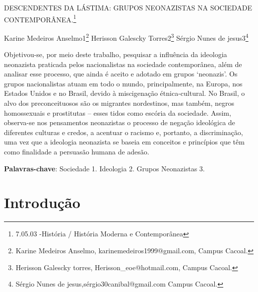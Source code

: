 \documentclass[article,12pt,onesidea,4paper,english,brazil]{abntex2}
\begin{document}
	
	
	\frenchspacing 
	
	\begin{center}
		\LARGE DESCENDENTES DA LÁSTIMA:
		GRUPOS NEONAZISTAS NA SOCIEDADE CONTEMPORÂNEA.\footnote{ 7.05.03 -História / História Moderna e Contemporânea}
		
		\normalsize
	Karine Medeiros Anselmo1\footnote{Karine Medeiros Anselmo, karinemedeiros1999@gmail.com, Campus Cacoal.} 
	Herisson Galescky Torres2\footnote{Herisson Galescky torres, Herisson\_eoe@hotmail.com, Campus Cacoal.} 
	Sérgio Nunes de jesus3\footnote{Sérgio Nunes de jesus,sérgio30canibal@gmail.com Campus Cacoal.} 
	\end{center}
	
	\begin{resumoumacoluna}
		Objetivou-se, por meio deste trabalho, pesquisar a influência da ideologia neonazista praticada pelos nacionalistas na sociedade contemporânea, além de analisar esse processo, que ainda é aceito e adotado em grupos ‘neonazis’. Os grupos nacionalistas atuam em todo o mundo, principalmente, na Europa, nos Estados Unidos e no Brasil, devido à miscigenação étnica-cultural. No Brasil, o alvo dos preconceituosos são os migrantes nordestinos, mas também, negros homossexuais e prostitutas – esses tidos como escória da sociedade. Assim, observa-se nos pensamentos neonazistas o processo de negação ideológica de diferentes culturas e credos, a acentuar o racismo e, portanto, a discriminação, uma vez que a ideologia neonazista se baseia em conceitos e princípios que têm como finalidade a persuasão humana de adesão.
		
		\vspace{\onelineskip}
		
		\noindent
		\textbf{Palavras-chave}: Sociedade 1. Ideologia 2. Grupos Neonazistas 3.
	\end{resumoumacoluna}
	
	\section*{Introdução}
	
\end{document}
